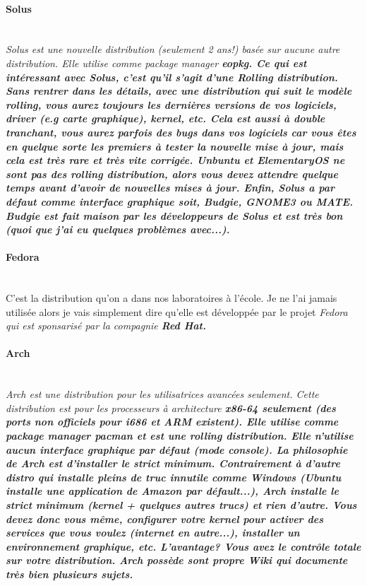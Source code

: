 \documentclass[12pt,oneside,final]{article}
\begin{document}
\paragraph{Solus} ~ \\
\it{Solus} est une nouvelle distribution (seulement 2 ans!) basée sur
aucune autre distribution. Elle utilise comme \it{package manager}
\bf{eopkg}. Ce qui est intéressant avec \it{Solus}, c'est qu'il
s'agit d'une \bf{Rolling} distribution. Sans rentrer dans les
détails, avec une distribution qui suit le modèle \it{rolling}, vous
aurez toujours les dernières versions de vos logiciels, \bf{driver}
(\it{e.g} carte graphique), \it{kernel}, etc. Cela est aussi à
double tranchant, vous aurez parfois des bugs dans vos logiciels car
vous êtes en quelque sorte les premiers à tester la nouvelle mise à
jour, mais cela est très rare et très vite corrigée. \it{Unbuntu} et
\it{ElementaryOS} ne sont pas des \it{rolling} distribution, alors
vous devez attendre quelque temps avant d'avoir de nouvelles mises à
jour. Enfin, \it{Solus} a par défaut comme interface graphique soit,
\bf{Budgie}, \bf{GNOME3} ou \bf{MATE}. \it{Budgie} est fait maison
par les développeurs de \it{Solus} et est très bon (quoi que j'ai eu
quelques problèmes avec...).

\paragraph{Fedora} ~ \\
C'est la distribution qu'on a dans nos laboratoires à l'école. Je ne
l'ai jamais utilisée alors je vais simplement dire qu'elle est
développée par le projet \it{Fedora} qui est sponsarisé par la
compagnie \bf{Red Hat}.


\paragraph{Arch} ~ \\
\it{Arch} est une distribution pour les utilisatrices avancées
seulement. Cette distribution est pour les processeurs à
architecture \bf{x86-64} seulement (des ports non officiels pour
\bf{i686} et \bf{ARM} existent). Elle utilise comme \it{package
  manager} \bf{pacman} et est une \it{rolling} distribution. Elle
n'utilise aucun interface graphique par défaut (mode console). La
philosophie de \it{Arch} est d'installer le strict
minimum. Contrairement à d'autre distro qui installe pleins de truc
innutile comme \it{Windows} (\it{Ubuntu} installe une application de
Amazon par défault...), \it{Arch} installe le strict minimum (kernel
+ quelques autres trucs) et rien d'autre. Vous devez donc vous même,
configurer votre \it{kernel} pour activer des services que vous
voulez (internet en autre...), installer un environnement graphique,
etc. L'avantage? Vous avez le contrôle totale sur votre
distribution. \it{Arch} possède sont propre \it{Wiki} qui documente
très bien plusieurs sujets.
\end{document}

